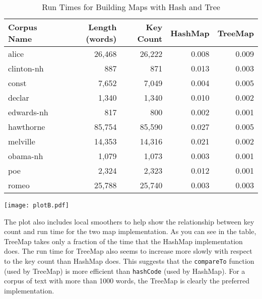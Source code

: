 \documentclass[12pt]{article}
\begin{document}
\begin{table}[h]
\caption{Run Times for Building Maps with Hash and Tree}
\begin{center}
\begin{tabular}{lrrrr}
Corpus Name & Length (words) & Key Count & HashMap &  TreeMap \\
\hline
alice & 26,468 & 26,222 & 0.008  & 0.009 \\
clinton-nh & 887 & 871 & 0.013 & 0.003  \\
const & 7,652 & 7,049 & 0.004 & 0.005 \\ 
declar & 1,340 & 1,340 & 0.010 & 0.002 \\
edwards-nh & 817 & 800 & 0.002 & 0.001 \\ 
hawthorne & 85,754 & 85,590 & 0.027 & 0.005 \\
melville & 14,353 & 14,316 & 0.021 & 0.002 \\
obama-nh & 1,079 & 1,073 & 0.003 & 0.001 \\
poe & 2,324 & 2,323 & 0.012 & 0.001 \\
romeo & 25,788 & 25,740 & 0.003 & 0.003 
\end{tabular}
\end{center}
\end{table}

\begin{center}
\texttt{[image: plotB.pdf]}
\end{center}

The plot also includes local smoothers to help show the relationship between key count and run time for the two map implementation. As you can see in the table, TreeMap takes only a fraction of the time that the HashMap implementation does. The run time for TreeMap also seems to increase more slowly with respect to the key count than HashMap does. This suggests that the \texttt{compareTo} function (used by TreeMap) is more efficient than \texttt{hashCode} (used by HashMap). For a corpus of text with more than 1000 words, the TreeMap is clearly the preferred implementation. 
\end{document}
